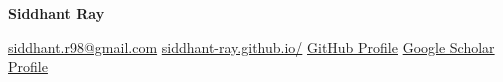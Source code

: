 {\centering
  {\fontsize{28}{31}\selectfont\bfseries Siddhant Ray}\par
  \vspace{2pt}
  {\small
  \href{mailto:siddhant.r98@gmail.com}{siddhant.r98@gmail.com}\quad
  \href{https://siddhant-ray.github.io/}{siddhant-ray.github.io/}\quad
  \href{https://github.com/Siddhant-Ray}{GitHub Profile}\quad
  \href{https://scholar.google.com/citations?user=sHQFKFUAAAAJ\&hl=en}{\contacticon{\googlescholarlogo}Google Scholar Profile}}
\par}
